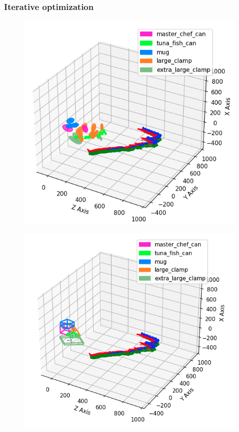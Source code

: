 \documentclass[report.tex]{subfiles}
\begin{document}
\subsubsection{Iterative optimization}
\begin{itemize}

\begin{figure}[H]
\centering
\begin{minipage}{.45\textwidth}
  \centering
  \includegraphics[width=\textwidth]{Images/iter_box_traj.png}
  \label{fig:iterative_48}
\end{minipage}%
\begin{minipage}{.45\textwidth}
  \centering
  \includegraphics[width=\textwidth]{Images/48_gt_traj_box.png}
  \label{fig:ground_truth_48}
\end{minipage}
\end{figure}


\end{itemize}
\end{document}
